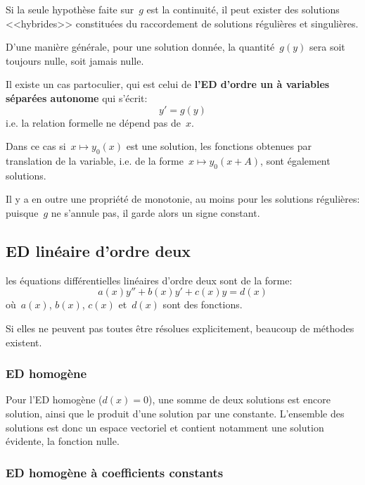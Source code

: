 Si la seule hypothèse faite sur~$g$ est la continuité, il peut exister des solutions <<hybrides>> 
constituées du raccordement de solutions régulières et singulières. 

D'une manière générale, pour une solution donnée, la quantité~$g(y)$ sera soit toujours nulle, 
soit jamais nulle.

\medskip
Il existe un cas partoculier, qui est celui de \textbf{l'ED d'ordre un à variables séparées autonome}
qui s'écrit:
\begin{equation}
  y' = g(y)
\end{equation}
i.e. la relation formelle ne dépend pas de~$x$. 

Dans ce cas si~$x \mapsto y_0(x)$ est une solution, les fonctions obtenues par translation de la variable, 
i.e. de la forme~$x \mapsto y_0(x+A)$, sont également solutions. 

Il y a en outre une propriété de monotonie, au moins pour les solutions régulières: 
puisque~$g$ ne s'annule pas, il garde alors un signe constant.



\medskip
\subsection{ED linéaire d'ordre deux}

les équations différentielles linéaires d'ordre deux sont de la forme: 
\begin{equation}
a(x)y'' + b(x)y' + c(x)y = d(x)
\end{equation}
où~$a(x)$, $b(x)$, $c(x)$ et~$d(x)$ sont des fonctions.

Si elles ne peuvent pas toutes être résolues explicitement, beaucoup de méthodes existent.

\medskip
\subsubsection{ED homogène}

Pour l'ED homogène ($d(x)=0$), une somme de deux solutions est encore solution, ainsi que le 
produit d'une solution par une constante. 
L'ensemble des solutions est donc un espace vectoriel et contient notamment une solution évidente, 
la fonction nulle.

\medskip
\subsubsection{ED homogène à coefficients constants}

